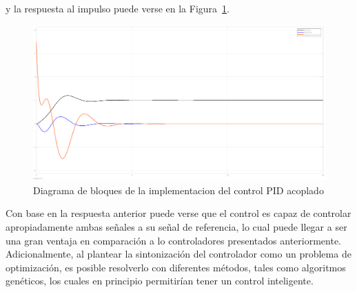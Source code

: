 y la respuesta al impulso puede verse en la Figura~\ref{fig:controlS}.\\
\begin{figure}[t]
  \label{fig:controlS}
  \includegraphics[scale=0.15]{Figuras/controlS}
  \caption{Diagrama de bloques de la implementacion del control PID acoplado} 
\end{figure}

Con base en la respuesta anterior puede verse que el control es capaz de controlar apropiadamente ambas
señales a su señal de referencia, lo cual puede llegar a ser una gran ventaja en comparación
a lo controladores presentados anteriormente. Adicionalmente, al plantear la sintonización del
controlador como un problema de optimización, es posible resolverlo con diferentes métodos, tales
como algoritmos genéticos, los cuales en principio permitirían tener un control inteligente.
